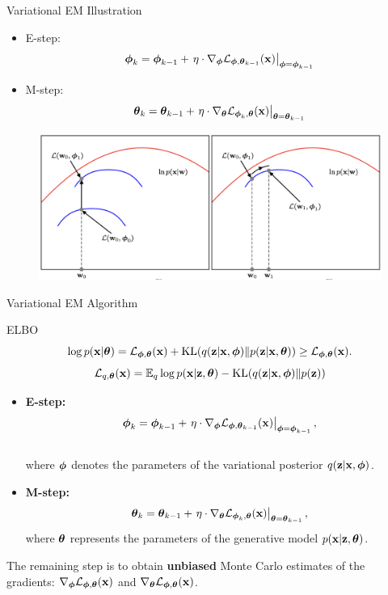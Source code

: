 \documentclass{beamer}
\begin{document}
\begin{frame}{Variational EM Illustration}
	\begin{itemize}
		\item E-step:
		\[
			\boldsymbol{\phi}_k = \boldsymbol{\phi}_{k-1} + \left.\eta \cdot \nabla_{\boldsymbol{\phi}} \mathcal{L}_{\boldsymbol{\phi}, \boldsymbol{\theta}_{k-1}}(\mathbf{x})\right|_{\boldsymbol{\phi}=\boldsymbol{\phi}_{k-1}}
		\]
		\item M-step:
		\[
			\boldsymbol{\theta}_k = \boldsymbol{\theta}_{k-1} + \left.\eta \cdot \nabla_{\boldsymbol{\theta}} \mathcal{L}_{\boldsymbol{\phi}_k, \boldsymbol{\theta}}(\mathbf{x})\right|_{\boldsymbol{\theta}=\boldsymbol{\theta}_{k-1}}
		\]
	\end{itemize}
	\begin{figure}
		\includegraphics[width=\linewidth]{figs/em_bishop4}
	\end{figure}
		
\end{frame}
\begin{frame}{Variational EM Algorithm}
	\begin{block}{ELBO}
		\vspace{-0.5cm}
		\[
			\log p(\mathbf{x}| \boldsymbol{\theta}) = \mathcal{L}_{\boldsymbol{\phi}, \boldsymbol{\theta}}(\mathbf{x}) + \mathrm{KL}(q(\mathbf{z} | \mathbf{x}, \boldsymbol{\phi}) \| p(\mathbf{z}|\mathbf{x}, \boldsymbol{\theta})) \geq \mathcal{L}_{\boldsymbol{\phi}, \boldsymbol{\theta}}(\mathbf{x}).
		\]
		\[
		 	\mathcal{L}_{q, \boldsymbol{\theta}}(\mathbf{x}) = \mathbb{E}_{q} \log p(\mathbf{x} | \mathbf{z}, \boldsymbol{\theta}) - \mathrm{KL}(q(\mathbf{z} | \mathbf{x}, \boldsymbol{\phi}) \| p(\mathbf{z}))
		\]
		\vspace{-0.5cm}
	\end{block}
	\eqpause
	\begin{itemize}
		\item \textbf{E-step:}
		\vspace{-0.3cm}
		\[
			\boldsymbol{\phi}_k = \boldsymbol{\phi}_{k-1} + \left.\eta \cdot \nabla_{\boldsymbol{\phi}} \mathcal{L}_{\boldsymbol{\phi}, \boldsymbol{\theta}_{k-1}}(\mathbf{x})\right|_{\boldsymbol{\phi}=\boldsymbol{\phi}_{k-1}},
		\]
		\vspace{-0.3cm} \\
		where $\boldsymbol{\phi}$ denotes the parameters of the variational posterior $q(\mathbf{z} | \mathbf{x}, \boldsymbol{\phi})$.
		\item \textbf{M-step:}
		\[
			\boldsymbol{\theta}_k = \boldsymbol{\theta}_{k-1} + \left.\eta \cdot \nabla_{\boldsymbol{\theta}} \mathcal{L}_{\boldsymbol{\phi}_k, \boldsymbol{\theta}}(\mathbf{x})\right|_{\boldsymbol{\theta}=\boldsymbol{\theta}_{k-1}},
		\]
		where $\boldsymbol{\theta}$ represents the parameters of the generative model $p(\mathbf{x} | \mathbf{z}, \boldsymbol{\theta})$.
	\end{itemize}
	\eqpause
	The remaining step is to obtain \textbf{unbiased} Monte Carlo estimates of the gradients: $\nabla_{\boldsymbol{\phi}} \mathcal{L}_{\boldsymbol{\phi}, \boldsymbol{\theta}}(\mathbf{x})$ and $\nabla_{\boldsymbol{\theta}} \mathcal{L}_{\boldsymbol{\phi}, \boldsymbol{\theta}}(\mathbf{x})$. 
\end{frame}
\end{document}
